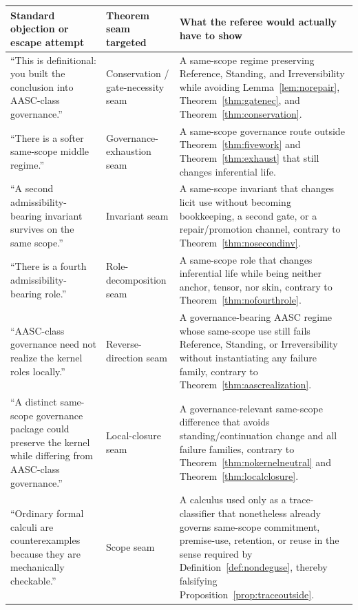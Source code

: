 \documentclass[11pt]{article}
\begin{document}
\begin{center}
\renewcommand{\arraystretch}{1.2}
\small
\begin{tabular}{|p{}|p{}|p{}|}
\hline
\textbf{Standard objection or escape attempt} & \textbf{Theorem seam targeted} & \textbf{What the referee would actually have to show} \\
\hline
``This is definitional: you built the conclusion into AASC-class governance.'' & Conservation / gate-necessity seam & A same-scope regime preserving Reference, Standing, and Irreversibility while avoiding Lemma~\ref{lem:norepair}, Theorem~\ref{thm:gatenec}, and Theorem~\ref{thm:conservation}. \\
\hline
``There is a softer same-scope middle regime.'' & Governance-exhaustion seam & A same-scope governance route outside Theorem~\ref{thm:fivework} and Theorem~\ref{thm:exhaust} that still changes inferential life. \\
\hline
``A second admissibility-bearing invariant survives on the same scope.'' & Invariant seam & A same-scope invariant that changes licit use without becoming bookkeeping, a second gate, or a repair/promotion channel, contrary to Theorem~\ref{thm:nosecondinv}. \\
\hline
``There is a fourth admissibility-bearing role.'' & Role-decomposition seam & A same-scope role that changes inferential life while being neither anchor, tensor, nor skin, contrary to Theorem~\ref{thm:nofourthrole}. \\
\hline
``AASC-class governance need not realize the kernel roles locally.'' & Reverse-direction seam & A governance-bearing AASC regime whose same-scope use still fails Reference, Standing, or Irreversibility without instantiating any failure family, contrary to Theorem~\ref{thm:aascrealization}. \\
\hline
``A distinct same-scope governance package could preserve the kernel while differing from AASC-class governance.'' & Local-closure seam & A governance-relevant same-scope difference that avoids standing/continuation change and all failure families, contrary to Theorem~\ref{thm:nokernelneutral} and Theorem~\ref{thm:localclosure}. \\
\hline
``Ordinary formal calculi are counterexamples because they are mechanically checkable.'' & Scope seam & A calculus used only as a trace-classifier that nonetheless already governs same-scope commitment, premise-use, retention, or reuse in the sense required by Definition~\ref{def:nondeguse}, thereby falsifying Proposition~\ref{prop:traceoutside}. \\
\hline
\end{tabular}
\end{center}
\end{document}
